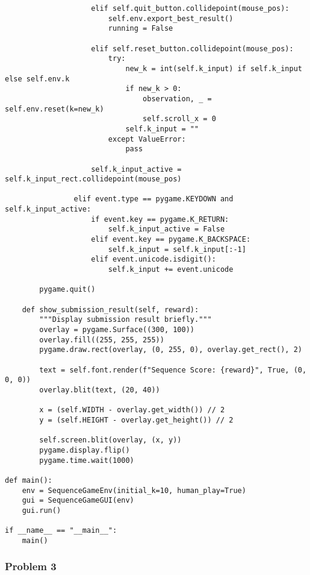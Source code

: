 \begin{lstlisting}
                    elif self.quit_button.collidepoint(mouse_pos):
                        self.env.export_best_result()
                        running = False
                    
                    elif self.reset_button.collidepoint(mouse_pos):
                        try:
                            new_k = int(self.k_input) if self.k_input else self.env.k
                            if new_k > 0:
                                observation, _ = self.env.reset(k=new_k)
                                self.scroll_x = 0
                            self.k_input = ""
                        except ValueError:
                            pass
                    
                    self.k_input_active = self.k_input_rect.collidepoint(mouse_pos)
                
                elif event.type == pygame.KEYDOWN and self.k_input_active:
                    if event.key == pygame.K_RETURN:
                        self.k_input_active = False
                    elif event.key == pygame.K_BACKSPACE:
                        self.k_input = self.k_input[:-1]
                    elif event.unicode.isdigit():
                        self.k_input += event.unicode
        
        pygame.quit()

    def show_submission_result(self, reward):
        """Display submission result briefly."""
        overlay = pygame.Surface((300, 100))
        overlay.fill((255, 255, 255))
        pygame.draw.rect(overlay, (0, 255, 0), overlay.get_rect(), 2)
        
        text = self.font.render(f"Sequence Score: {reward}", True, (0, 0, 0))
        overlay.blit(text, (20, 40))
        
        x = (self.WIDTH - overlay.get_width()) // 2
        y = (self.HEIGHT - overlay.get_height()) // 2
        
        self.screen.blit(overlay, (x, y))
        pygame.display.flip()
        pygame.time.wait(1000)

def main():
    env = SequenceGameEnv(initial_k=10, human_play=True)
    gui = SequenceGameGUI(env)
    gui.run()

if __name__ == "__main__":
    main()

\end{lstlisting}


\newpage
\clearpage

\subsubsection*{Problem 3}
\label{appendix:G_2023_IMO_Shortlist_C3}


